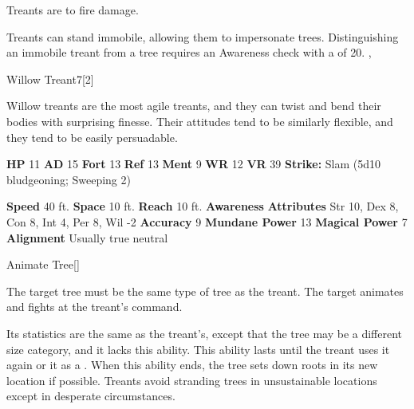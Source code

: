         Treants are  to fire damage.
      
        Treants can stand immobile, allowing them to impersonate trees.
        Distinguishing an immobile treant from a tree requires an Awareness check with a  of 20.
  ,
  \begin{monsubsection}{Willow Treant}{7}[2]
    \vspace{-1em}\vspace{-1em}
    \vspace{0em}

    
        Willow treants are the most agile treants, and they can twist and bend their bodies with surprising finesse.
        Their attitudes tend to be similarly flexible, and they tend to be easily persuadable.
      
    

    \begin{spellcontent}
      \begin{spelltargetinginfo}
        \pari \textbf{HP} 11 \monsep
          \textbf{AD} 15 \monsep
          \textbf{Fort} 13 \monsep
          \textbf{Ref} 13 \monsep
          \textbf{Ment} 9
        \pari \textbf{WR} 12 \monsep
        \textbf{VR} 39
        \pari \textbf{Strike:}
            Slam  (5d10 bludgeoning; Sweeping 2)
      \end{spelltargetinginfo}
    \end{spellcontent}
    \begin{monsterfooter}
      \pari \textbf{Speed} 40 ft. \monsep
        \textbf{Space} 10 ft. \monsep
        \textbf{Reach} 10 ft.
      \pari \textbf{Awareness} 
      \pari \textbf{Attributes}
        Str 10, Dex 8,
        Con 8, Int 4,
        Per 8, Wil -2
      \pari \textbf{Accuracy} 9 \monsep
        \textbf{Mundane Power} 13 \monsep
      \textbf{Magical Power} 7
      \pari \textbf{Alignment} Usually true neutral
    \end{monsterfooter}
  \end{monsubsection}
  \begin{freeability}{Animate Tree}[]
      
        The target tree must be the same type of tree as the treant.
        The target animates and fights at the treant's command.

        Its statistics are the same as the treant's, except that the tree may be a different size category, and it lacks this ability.
        This ability lasts until the treant uses it again or  it as a .
        When this ability ends, the tree sets down roots in its new location if possible.
        Treants avoid stranding trees in unsustainable locations except in desperate circumstances.
      
    \end{freeability}
  
